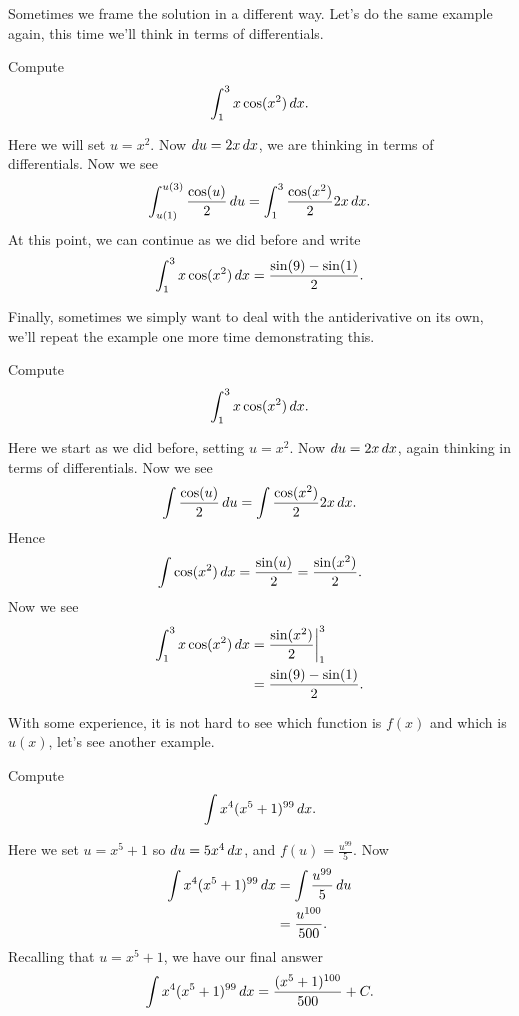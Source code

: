 Sometimes we frame the solution in a different way. Let's do the same
example again, this time we'll think in terms of differentials.

\begin{example}
Compute
\[
\int_1^3 x\cos(x^2)\, d x.
\]
\end{example}
\begin{solution}
Here we will set $u=x^2$. Now $du = 2x \, d x$, we are thinking in terms
of differentials. Now we see
\[
\int_{u(1)}^{u(3)} \frac{\cos(u)}{2}\, d u = \int_1^3\frac{\cos(x^2)}{2}2x\, d x.
\]
At this point, we can continue as we did before and write
\[
\int_1^3 x\cos(x^2)\, d x= \frac{\sin(9) -\sin(1)}{2}.
\]
\end{solution}

Finally, sometimes we simply want to deal with the antiderivative on
its own, we'll repeat the example one more time demonstrating this.

\begin{example}
Compute
\[
\int_1^3 x\cos(x^2)\, d x.
\]
\end{example}
\begin{solution}
Here we start as we did before, setting $u=x^2$. Now $du = 2x \, d x$,
again thinking in terms of differentials. Now we see
\[
\int  \frac{\cos(u)}{2}\, d u = \int \frac{\cos(x^2)}{2}2x\, d x.
\]
Hence 
\[
\int \cos(x^2)\, d x = \frac{\sin(u)}{2} = \frac{\sin(x^2)}{2}.
\]
Now we see
\begin{align*}
\int_1^3 x\cos(x^2)\, d x &=\frac{\sin(x^2)}{2}\bigg|_1^3\\
&= \frac{\sin(9) -\sin(1)}{2}.
\end{align*}
\end{solution}

With some experience, it is not hard to see which function is $f(x)$
and which is $u(x)$, let's see another example.
\begin{example}
Compute
\[
\int x^4(x^5+1)^{99} \, d x.
\]
\end{example}

\begin{solution}
Here we set $u = x^5+1$ so $du = 5x^4 \, d x$, and $f(u) = \frac{u^{99}}{5}$. Now
\begin{align*}
\int x^4(x^5+1)^{99} \, d x &= \int \frac{u^{99}}{5} \, d u\\
&= \frac{u^{100}}{500}.
\end{align*}
Recalling that $u = x^5+1$, we have our final answer
\[
\int x^4(x^5+1)^{99} \, d x= \frac{(x^5+1)^{100}}{500}+C.
\]
\end{solution}


